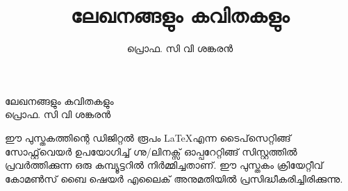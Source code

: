 \documentclass[12pt,a4paper]{book}
\title{\fontsize{40pt}{1em}\selectfont \color{white}ലേഖനങ്ങളും കവിതകളും}
\author{\fontsize{20pt}{1em}\selectfont \color{white} പ്രൊഫ. സി വി ശങ്കരൻ}
\date{}
\newcommand*\cleartoleftpage{%
  \clearpage
  \ifodd\value{page}\hbox{}\newpage\fi
}
\let\cleardoublepage\clearpage %
\begin{document}
\pagecolor{Maroon}
\maketitle
{}
\newpage\null\thispagestyle{empty}\newpage %
\pagecolor{white}
\newpage
\vspace*{5cm}
\begin{center}
\fontsize{40pt}{1em}\selectfont ലേഖനങ്ങളും കവിതകളും
\\
\fontsize{20pt}{1em}\selectfont  പ്രൊഫ. സി വി ശങ്കരൻ
\end{center}
\newpage
{}
\vspace*{\fill}
\noindent
\parbox{10.5cm}{
ഈ പുസ്തകത്തിന്റെ ഡിജിറ്റൽ രൂപം \LaTeX എന്ന ടൈപ്‌സെറ്റിങ്ങ് സോഫ്റ്റ്‌വെയർ ഉപയോഗിച്ച് ഗ്നു/ലിനക്സ് ഓപ്പറേറ്റിങ്ങ് സിസ്റ്റത്തിൽ പ്രവർത്തിക്കുന്ന ഒരു കമ്പ്യൂട്ടറിൽ നിർമ്മിച്ചതാണ്. ഈ പുസ്തകം ക്രിയേറ്റീവ് കോമൺസ് ബൈ ഷെയർ എലൈക് അനുമതിയിൽ പ്രസിദ്ധീകരിച്ചിരിക്കുന്നു.}
\cleartoleftpage
\tableofcontents
\newpage\null\thispagestyle{empty} %
\lfoot{}
\rfoot{}
\cfoot{\thepage} %
\lhead{}
\chead{}
\pagestyle{fancy}
\setcounter{page}{1} %
\renewcommand{\headrulewidth}{0pt}
\onehalfspacing















\cleardoublepage
\newpage
\pagecolor{Maroon}
\newpage\null\thispagestyle{empty}\newpage %
\newpage\null\thispagestyle{empty}\newpage %
\end{document}
